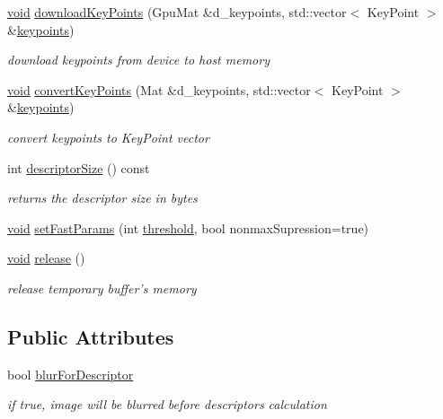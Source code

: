 \begin{DoxyCompactItemize}
\item 
\hyperlink{legacy_8hpp_a8bb47f092d473522721002c86c13b94e}{void} \hyperlink{classcv_1_1gpu_1_1ORB__GPU_a42d288361eec5a427ace4ef565edb43c}{download\-Key\-Points} (Gpu\-Mat \&d\-\_\-keypoints, std\-::vector$<$ Key\-Point $>$ \&\hyperlink{compat_8hpp_af95b6678bbbdd664ed15fe6d4190d355}{keypoints})
\begin{DoxyCompactList}\small\item\em download keypoints from device to host memory \end{DoxyCompactList}\item 
\hyperlink{legacy_8hpp_a8bb47f092d473522721002c86c13b94e}{void} \hyperlink{classcv_1_1gpu_1_1ORB__GPU_ae34e78f749b4f7304e994ab47cd7d1d5}{convert\-Key\-Points} (Mat \&d\-\_\-keypoints, std\-::vector$<$ Key\-Point $>$ \&\hyperlink{compat_8hpp_af95b6678bbbdd664ed15fe6d4190d355}{keypoints})
\begin{DoxyCompactList}\small\item\em convert keypoints to Key\-Point vector \end{DoxyCompactList}\item 
int \hyperlink{classcv_1_1gpu_1_1ORB__GPU_a852bdf3aaa1e42a87ed7bf08b3d7e3b1}{descriptor\-Size} () const 
\begin{DoxyCompactList}\small\item\em returns the descriptor size in bytes \end{DoxyCompactList}\item 
\hyperlink{legacy_8hpp_a8bb47f092d473522721002c86c13b94e}{void} \hyperlink{classcv_1_1gpu_1_1ORB__GPU_a34ee3127b5622c799955154159c96aac}{set\-Fast\-Params} (int \hyperlink{namespacecv_1_1gpu_a63944c7054df081596be6b4cf94df871}{threshold}, bool nonmax\-Supression=true)
\item 
\hyperlink{legacy_8hpp_a8bb47f092d473522721002c86c13b94e}{void} \hyperlink{classcv_1_1gpu_1_1ORB__GPU_a64d6e9116ad79907b1cc8191e736745d}{release} ()
\begin{DoxyCompactList}\small\item\em release temporary buffer's memory \end{DoxyCompactList}\end{DoxyCompactItemize}
\subsection*{Public Attributes}
\begin{DoxyCompactItemize}
\item 
bool \hyperlink{classcv_1_1gpu_1_1ORB__GPU_a58a0701ecca568ba949cd6e0e06ebaa6}{blur\-For\-Descriptor}
\begin{DoxyCompactList}\small\item\em if true, image will be blurred before descriptors calculation \end{DoxyCompactList}\end{DoxyCompactItemize}


